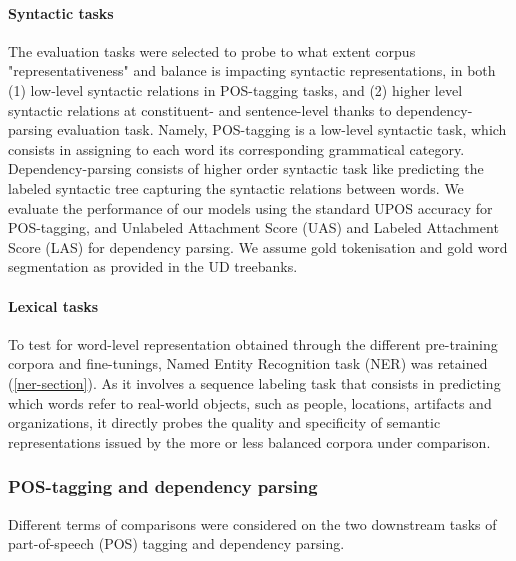 \paragraph{Syntactic tasks}
The evaluation tasks were selected to probe to what extent corpus "representativeness" and balance is impacting syntactic representations, in both (1) low-level syntactic relations in POS-tagging tasks, and (2) higher level syntactic relations at constituent- and sentence-level thanks to dependency-parsing evaluation task. Namely, POS-tagging is a low-level syntactic task, which consists in assigning to each word its corresponding grammatical category. Dependency-parsing consists of higher order syntactic task like predicting the labeled syntactic tree capturing the syntactic relations between words.
We evaluate the performance of our models using the standard UPOS accuracy for POS-tagging, and Unlabeled Attachment Score (UAS) and Labeled Attachment Score (LAS) for dependency parsing. We assume gold tokenisation and gold word segmentation as provided in the UD treebanks.

\paragraph{Lexical tasks}
To test for word-level representation obtained through the different pre-training corpora and fine-tunings, Named Entity Recognition task (NER) was retained (\ref{ner-section}). As it involves a sequence labeling task that consists in predicting which words refer to real-world objects, such as people, locations, artifacts and organizations, it directly probes the quality and specificity of semantic representations issued by the more or less balanced corpora under comparison.



\subsubsection{POS-tagging and dependency parsing}




Different terms of comparisons were considered on the two downstream tasks of part-of-speech (POS) tagging and dependency parsing.

